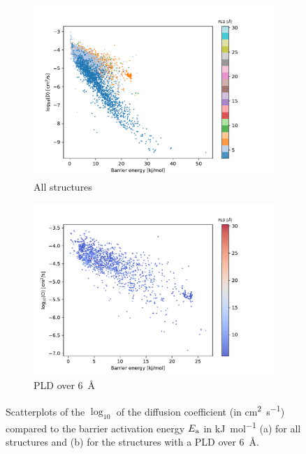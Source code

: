 \documentclass[main]{subfiles}
\begin{document}
\begin{figure}[ht]
  \centering
  \begin{subfigure}[b]{0.48\textwidth}
    \centering
    \includegraphics[width=\textwidth]{figures/5-diffusion/difflog_barrier_Df_uff.pdf}
    \caption{All structures}\label{fgr:barrier_diffusion_a}
\end{subfigure}
  \hfill
  \begin{subfigure}[b]{0.48\textwidth}
      \centering
      \includegraphics[width=\textwidth]{figures/5-diffusion/difflog_barrier_Df_uff_2.pdf}
      \caption{PLD over \SI{6}{\angstrom}}\label{fgr:barrier_diffusion_b}
  \end{subfigure}
    \caption{ Scatterplots of the $\log_{10}$ of the diffusion coefficient (in \si{\square\cm\per\s}) compared to the barrier activation energy $E_{\text{a}}$ in \si{\kJ\per\mol} (a) for all structures  and (b) for the structures with a PLD over \SI{6}{\angstrom}.}\label{fgr:barrier_diffusion}
\end{figure}
\end{document}
